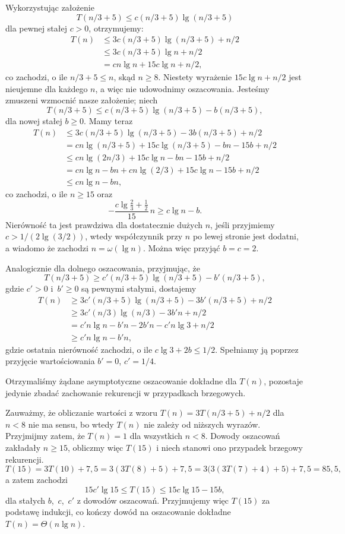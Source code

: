 Wykorzystując założenie
\[
	T(n/3+5) \le c(n/3+5)\lg(n/3+5)
\]
dla pewnej stałej $c>0$, otrzymujemy:
\begin{align*}
	T(n) &\le 3c(n/3+5)\lg(n/3+5)+n/2 \\
	&\le 3c(n/3+5)\lg n+n/2 \\
	&= cn\lg n+15c\lg n+n/2,
\end{align*}
co zachodzi, o ile $n/3+5\le n$, skąd $n\ge8$. Niestety wyrażenie $15c\lg n+n/2$ jest nieujemne dla każdego $n$, a więc nie udowodnimy oszacowania. Jesteśmy zmuszeni wzmocnić nasze założenie; niech
\[
	T(n/3+5) \le c(n/3+5)\lg(n/3+5)-b(n/3+5),
\]
dla nowej stałej $b\ge0$. Mamy teraz
\begin{align*}
	T(n) &\le 3c(n/3+5)\lg(n/3+5)-3b(n/3+5)+n/2 \\
	&= cn\lg(n/3+5)+15c\lg(n/3+5)-bn-15b+n/2 \\
	&\le cn\lg(2n/3)+15c\lg n-bn-15b+n/2 \\
	&= cn\lg n-bn+cn\lg(2/3)+15c\lg n-15b+n/2 \\
	&\le cn\lg n-bn,
\end{align*}
co zachodzi, o ile $n\ge15$ oraz
\[
	-\frac{c\lg\frac{2}{3}+\frac{1}{2}}{15}\,n \ge c\lg n-b.
\]
Nierówność ta jest prawdziwa dla dostatecznie dużych $n$, jeśli przyjmiemy $c>1/(2\lg(3/2))$, wtedy współczynnik przy $n$ po lewej stronie jest dodatni, a wiadomo że zachodzi $n=\omega(\lg n)$. Można więc przyjąć $b=c=2$.

Analogicznie dla dolnego oszacowania, przyjmując, że
\[
	T(n/3+5) \ge c'(n/3+5)\lg(n/3+5)-b'(n/3+5),
\]
gdzie $c'>0$ i~$b'\ge0$ są pewnymi stałymi, dostajemy
\begin{align*}
	T(n) &\ge 3c'(n/3+5)\lg(n/3+5)-3b'(n/3+5)+n/2 \\
	&\ge 3c'(n/3)\lg(n/3)-3b'n+n/2 \\
	&= c'n\lg n-b'n-2b'n-c'n\lg3+n/2 \\
	&\ge c'n\lg n-b'n,
\end{align*}
gdzie ostatnia nierówność zachodzi, o ile $c\lg3+2b\le1/2$. Spełniamy ją poprzez przyjęcie wartościowania $b'=0$, $c'=1/4$.

Otrzymaliśmy żądane asymptotyczne oszacowanie dokładne dla $T(n)$, pozostaje jedynie zbadać zachowanie rekurencji w przypadkach brzegowych.

Zauważmy, że obliczanie wartości z wzoru $T(n)=3T(n/3+5)+n/2$ dla $n<8$ nie ma sensu, bo wtedy $T(n)$ nie zależy od niższych wyrazów. Przyjmijmy zatem, że $T(n)=1$ dla wszystkich $n<8$. Dowody oszacowań zakładały $n\ge15$, obliczmy więc $T(15)$ i niech stanowi ono przypadek brzegowy rekurencji.
\[
	T(15) = 3T(10)+7{,}5 = 3(3T(8)+5)+7{,}5 = 3\bigl(3(3T(7)+4)+5\bigr)+7{,}5 = 85{,}5,
\]
a zatem zachodzi
\[
	15c'\lg15 \le T(15) \le 15c\lg15-15b,
\]
dla stałych $b$,~$c$,~$c'$ z dowodów oszacowań. Przyjmujemy więc $T(15)$ za podstawę indukcji, co kończy dowód na oszacowanie dokładne $T(n)=\Theta(n\lg n)$.

